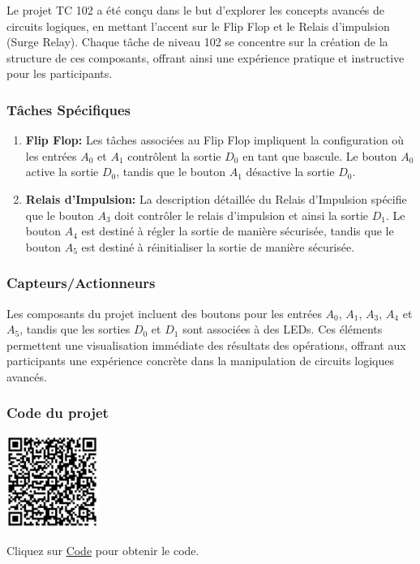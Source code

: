 \documentclass[a4paper,12pt]{report}
\begin{document}
Le projet TC 102 a été conçu dans le but d'explorer les concepts avancés de circuits logiques, en mettant l'accent sur le Flip Flop et le Relais d'impulsion (Surge Relay). Chaque tâche de niveau 102 se concentre sur la création de la structure de ces composants, offrant ainsi une expérience pratique et instructive pour les participants.

\subsubsection{Tâches Spécifiques}

\begin{enumerate}
    \item \textbf{Flip Flop:} Les tâches associées au Flip Flop impliquent la configuration où les entrées \(A_0\) et \(A_1\) contrôlent la sortie \(D_0\) en tant que bascule. Le bouton \(A_0\) active la sortie \(D_0\), tandis que le bouton \(A_1\) désactive la sortie \(D_0\).
    
    \item \textbf{Relais d'Impulsion:} La description détaillée du Relais d'Impulsion spécifie que le bouton \(A_3\) doit contrôler le relais d'impulsion et ainsi la sortie \(D_1\). Le bouton \(A_4\) est destiné à régler la sortie de manière sécurisée, tandis que le bouton \(A_5\) est destiné à réinitialiser la sortie de manière sécurisée.
\end{enumerate}

\subsubsection{Capteurs/Actionneurs}

Les composants du projet incluent des boutons pour les entrées \(A_0\), \(A_1\), \(A_3\), \(A_4\) et \(A_5\), tandis que les sorties \(D_0\) et \(D_1\) sont associées à des LEDs. Ces éléments permettent une visualisation immédiate des résultats des opérations, offrant aux participants une expérience concrète dans la manipulation de circuits logiques avancés.

\subsubsection{Code du projet}

\begin{minipage}{0.5\textwidth}
    \includegraphics[height=3cm]{Code TC102.png}
\end{minipage}%
\begin{minipage}{0.5\textwidth}
    Cliquez sur \href{https://github.com/DexterTaha/Controllino-PLC-Sample/blob/main/TC100/TC102_Bascule_RelayTemp%C3%AAte/TC102_Bascule_RelayTemp%C3%AAte.ino}{Code} pour obtenir le code.
\end{minipage}
\end{document}
